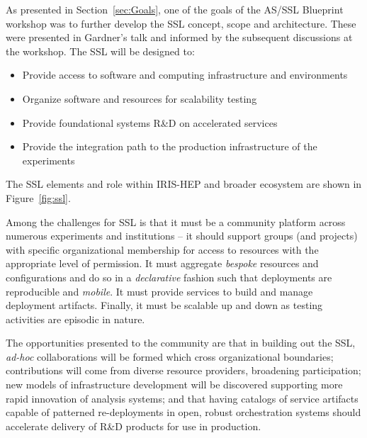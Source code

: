 \documentclass[11pt,letterpaper,fleqn]{article}
\begin{document}
As presented in Section~\ref{sec:Goals}, one of the goals of the AS/SSL Blueprint workshop was to further develop the SSL concept, scope and architecture. These were presented in Gardner's talk and informed by the subsequent discussions at the workshop. The SSL will be designed to:
\begin{itemize}
  \item Provide access to software and computing infrastructure and environments
  \item Organize software and resources for scalability testing
  \item Provide foundational systems R\&D on accelerated services
  \item Provide the integration path to the production infrastructure of the experiments
\end{itemize}
The SSL elements and role within IRIS-HEP and broader ecosystem are shown in Figure~\ref{fig:ssl}.

Among the challenges for SSL is that it must be a community platform across numerous experiments and institutions -- it should support groups (and projects) with specific organizational membership for access to resources with the appropriate level of permission. It must aggregate {\it bespoke} resources and configurations and do so in a {\it declarative} fashion such that deployments are reproducible and {\it mobile}. It must provide services to build and manage deployment artifacts. Finally, it must be scalable up and down as testing activities are episodic in nature.

The opportunities presented to the community are that in building out the SSL, \textit{ad-hoc} collaborations will be formed which cross organizational boundaries; contributions will come from diverse resource providers, broadening participation; new models of infrastructure development will be discovered supporting more rapid innovation of analysis systems; and that having catalogs of service artifacts capable of patterned re-deployments in open, robust orchestration systems should accelerate delivery of R\&D products for use in production.
\end{document}
